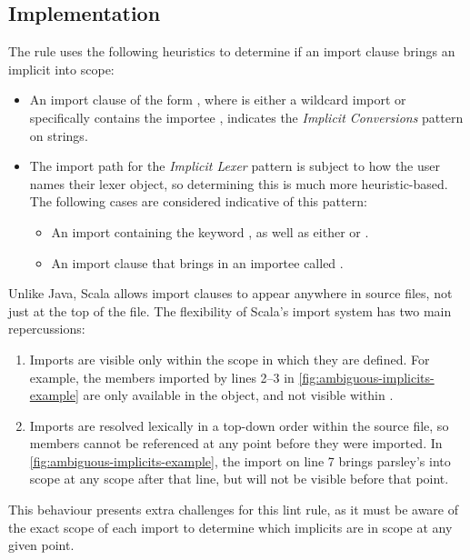 \documentclass[../../main.tex]{subfiles}
\begin{document}
\subsection{Implementation}
The rule uses the following heuristics to determine if an import clause brings an implicit into scope:
\begin{itemize}
  \item An import clause of the form , where  is either a wildcard import or specifically contains the importee , indicates the \emph{Implicit Conversions} pattern on strings.
  \item The import path for the \emph{Implicit Lexer} pattern is subject to how the user names their lexer object, so determining this is much more heuristic-based. The following cases are considered indicative of this pattern:
  \begin{itemize}
    \item An import containing the keyword , as well as either  or .
    \item An import clause that brings in an importee called .
  \end{itemize}
\end{itemize}
%
Unlike Java, Scala allows import clauses to appear anywhere in source files, not just at the top of the file.
The flexibility of Scala's import system has two main repercussions:
\begin{enumerate}
  \item Imports are visible only within the scope in which they are defined. For example, the members imported by lines 2--3 in \cref{fig:ambiguous-implicits-example} are only available in the  object, and not visible within .
  \item Imports are resolved lexically in a top-down order within the source file, so members cannot be referenced at any point before they were imported. In \cref{fig:ambiguous-implicits-example}, the import on line 7 brings parsley's  into scope at any scope after that line, but will not be visible before that point.
\end{enumerate} 
This behaviour presents extra challenges for this lint rule, as it must be aware of the exact scope of each import to determine which implicits are in scope at any given point.
\end{document}

